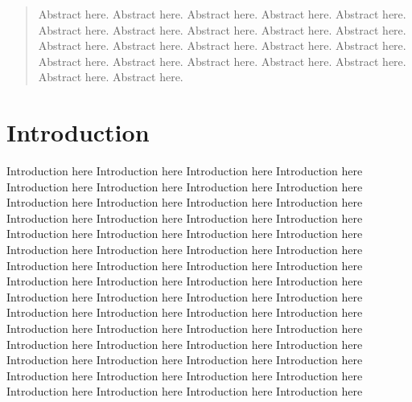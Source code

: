 \documentclass{gshs_poster_rpt}
\begin{document}
\pagestyle{fancy}
\maketitle
\vspace{1em} 


\begin{multicols}{3} 

\color{gshsblue!50!black}
\begin{abstract}
Abstract here. Abstract here. Abstract here. Abstract here. Abstract here. Abstract here. Abstract here. Abstract here. Abstract here. Abstract here. Abstract here. Abstract here. Abstract here. Abstract here. Abstract here. Abstract here. Abstract here. Abstract here. Abstract here. Abstract here. Abstract here. Abstract here.
\end{abstract}


\color{Black} 
\section*{Introduction}
Introduction here Introduction here Introduction here Introduction here Introduction here Introduction here Introduction here Introduction here Introduction here Introduction here Introduction here Introduction here Introduction here Introduction here Introduction here Introduction here Introduction here Introduction here Introduction here Introduction here Introduction here Introduction here Introduction here Introduction here
Introduction here Introduction here Introduction here Introduction here Introduction here Introduction here Introduction here Introduction here Introduction here Introduction here Introduction here Introduction here
Introduction here Introduction here Introduction here Introduction here Introduction here Introduction here Introduction here Introduction here Introduction here Introduction here Introduction here Introduction here
Introduction here Introduction here Introduction here Introduction here Introduction here Introduction here Introduction here Introduction here Introduction here Introduction here Introduction here Introduction here



\end{multicols}
\end{document}

